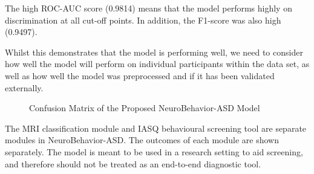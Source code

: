 \documentclass[conference]{IEEEtran}
\begin{document}
The high ROC-AUC score (0.9814) means that the model performs highly on discrimination at all cut-off points. In addition, the F1-score was also high (0.9497).

Whilst this demonstrates that the model is performing well, we need to consider how well the model will perform on individual participants within the data set, as well as how well the model was preprocessed and if it has been validated externally.

\begin{figure}[h]
\centering
{}
\caption{Confusion Matrix of the Proposed NeuroBehavior-ASD Model}
\label{fig:confusion_matrix}
\end{figure}

The MRI classification module and IASQ behavioural screening tool are separate modules in NeuroBehavior-ASD. The outcomes of each module are shown separately. The model is meant to be used in a research setting to aid screening, and therefore should not be treated as an end-to-end diagnostic tool.

\end{document}
